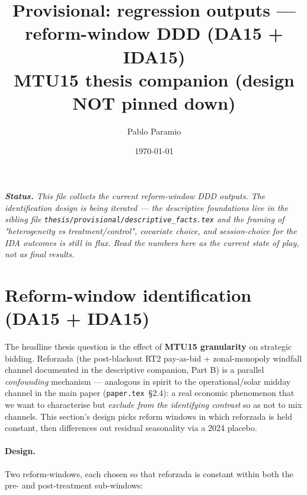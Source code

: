 \documentclass[11pt,a4paper]{article}
\title{Provisional: regression outputs --- reform-window DDD (DA15 + IDA15)\\[3pt]\large MTU15 thesis companion (design NOT pinned down)}
\author{Pablo Paramio}
\date{\today}
\newcommand{\code}[1]{\nolinkurl{#1}}
\begin{document}
\maketitle

\noindent\emph{\textbf{Status.} This file collects the current reform-window DDD outputs. The identification design is being iterated --- the descriptive foundations live in the sibling file \code{thesis/provisional/descriptive_facts.tex} and the framing of "heterogeneity vs treatment/control", covariate choice, and session-choice for the IDA outcomes is still in flux. Read the numbers here as the current state of play, not as final results.}

\tableofcontents

\bigskip

\section{Reform-window identification (DA15 + IDA15)}\label{sec:prov:reform_window_ddd}

\noindent The headline thesis question is the effect of \textbf{MTU15 granularity} on strategic bidding. Reforzada (the post-blackout RT2 pay-as-bid + zonal-monopoly windfall channel documented in the descriptive companion, Part B) is a parallel \emph{confounding} mechanism --- analogous in spirit to the operational/solar midday channel in the main paper (\code{paper.tex}~\S2.4): a real economic phenomenon that we want to characterise but \emph{exclude from the identifying contrast} so as not to mix channels. This section's design picks reform windows in which reforzada is held constant, then differences out residual seasonality via a 2024 placebo.

\paragraph{Design.} Two reform-windows, each chosen so that reforzada is constant within both the pre- and post-treatment sub-windows:
\end{document}
